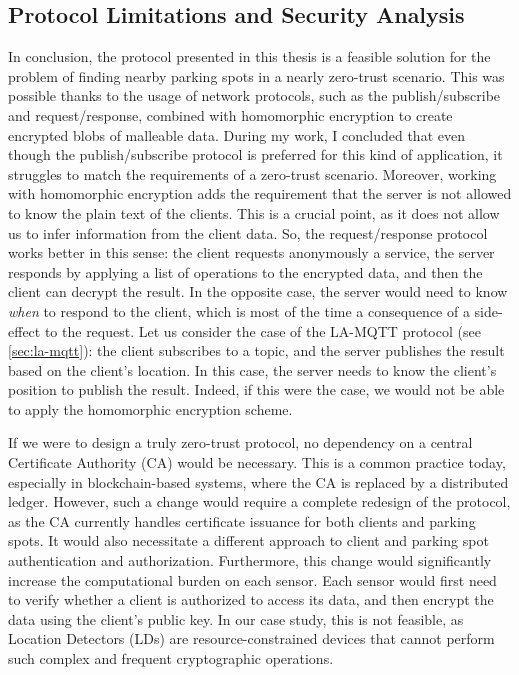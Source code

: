 \subsection{Protocol Limitations and Security Analysis}

In conclusion, the protocol presented in this thesis is a feasible solution for the problem of finding nearby parking spots in a nearly zero-trust scenario. This was possible thanks to the usage of network protocols, such as the publish/subscribe and request/response, combined with homomorphic encryption to create encrypted blobs of malleable data. 
During my work, I concluded that even though the publish/subscribe protocol is preferred for this kind of application, it struggles to match the requirements of a zero-trust scenario. Moreover, working with homomorphic encryption adds the requirement that the server is not allowed to know the plain text of the clients. This is a crucial point, as it does not allow us to infer information from the client data. So, the request/response protocol works better in this sense: the client requests anonymously a service, the server responds by applying a list of operations to the encrypted data, and then the client can decrypt the result. In the opposite case, the server would need to know \emph{when} to respond to the client, which is most of the time a consequence of a side-effect to the request. Let us consider the case of the LA-MQTT protocol (see \cref{sec:la-mqtt}): the client subscribes to a topic, and the server publishes the result based on the client's location. In this case, the server needs to know the client's position to publish the result. Indeed, if this were the case, we would not be able to apply the homomorphic encryption scheme.

If we were to design a truly zero-trust protocol, no dependency on a central Certificate Authority (CA) would be necessary. This is a common practice today, especially in blockchain-based systems, where the CA is replaced by a distributed ledger. However, such a change would require a complete redesign of the protocol, as the CA currently handles certificate issuance for both clients and parking spots. It would also necessitate a different approach to client and parking spot authentication and authorization.
Furthermore, this change would significantly increase the computational burden on each sensor. Each sensor would first need to verify whether a client is authorized to access its data, and then encrypt the data using the client’s public key. In our case study, this is not feasible, as Location Detectors (LDs) are resource-constrained devices that cannot perform such complex and frequent cryptographic operations.

